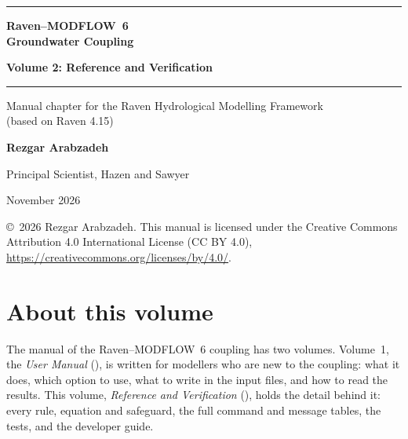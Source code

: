 \documentclass[11pt,a4paper]{report}
\begin{document}
\begin{titlepage}
\centering
\vspace*{3.5cm}
{\color{brand}\rule{\linewidth}{1.2pt}}\par\vspace{16pt}
{\sffamily\bfseries\fontsize{30}{38}\selectfont\color{brand}Raven--MODFLOW~6\\[4pt]Groundwater Coupling\par}
\vspace{10pt}
{\sffamily\bfseries\LARGE\color{brand}Volume 2: Reference and Verification\par}
\vspace{14pt}
{\color{brand}\rule{\linewidth}{1.2pt}}\par\vspace{24pt}
{\large Manual chapter for the Raven Hydrological Modelling Framework\\[2pt](based on Raven 4.15)\par}
\vfill
{\sffamily\Large\bfseries Rezgar Arabzadeh\par}
\vspace{4pt}
{\large Principal Scientist, Hazen and Sawyer\par}
\vspace{2cm}
{\large November 2026\par}
\vspace{1.2cm}
{\footnotesize\color{gray!70!black}\copyright\ 2026 Rezgar Arabzadeh. This manual is licensed under the Creative Commons Attribution 4.0
International License (CC BY 4.0), \url{https://creativecommons.org/licenses/by/4.0/}.\par}
\end{titlepage}
\begingroup\small\tableofcontents\endgroup
\cleardoublepage
\chapter*{About this volume}
The manual of the Raven--MODFLOW~6 coupling has two volumes. Volume~1, the \emph{User Manual}
(), is written for modellers who are new to the coupling: what it does, which option to
use, what to write in the input files, and how to read the results. This volume, \emph{Reference and Verification}
(), holds the detail behind it: every rule, equation and safeguard, the full command and
message tables, the tests, and the developer guide.
\end{document}

